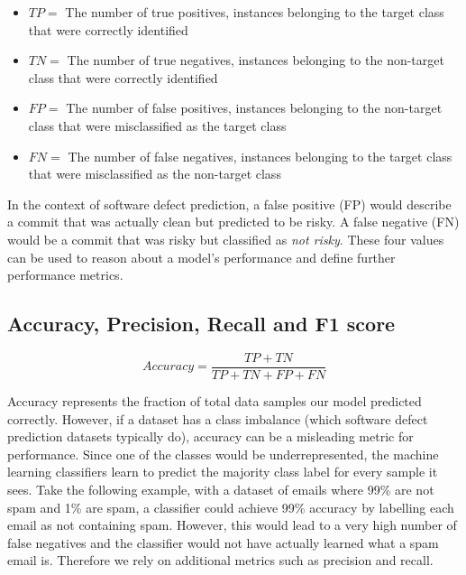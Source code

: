 \documentclass[../main.tex]{subfiles}
\begin{document}
\begin{itemize}
    \item $TP=$ The number of true positives, instances belonging to the target class that were correctly identified
    
    \item $TN=$ The number of true negatives, instances belonging to the non-target class that were correctly identified
    
    \item $FP=$ The number of false positives, instances belonging to the non-target class that were misclassified as the target class
    
    \item $FN=$ The number of false negatives, instances belonging to the target class that were misclassified as the non-target class
\end{itemize}

In the context of software defect prediction, a false positive (FP) would describe a commit that was actually clean but predicted to be risky. A false negative (FN) would be a commit that was risky but classified as \textit{not risky}. These four values can be used to reason about a model's performance and define further performance metrics. 

\subsection{Accuracy, Precision, Recall and F1 score}

\vspace{20pt}

\begin{equation}
    Accuracy = \frac{TP+TN}{TP+TN+FP+FN}
\end{equation}

\vspace{10pt}

Accuracy represents the fraction of total data samples our model predicted correctly. However, if a dataset has a class imbalance (which software defect prediction datasets typically do), accuracy can be a misleading metric for performance. Since one of the classes would be underrepresented, the machine learning classifiers learn to predict the majority class label for every sample it sees. Take the following example, with a dataset of emails where 99\% are not spam and 1\% are spam, a classifier could achieve 99\% accuracy by labelling each email as not containing spam. However, this would lead to a very high number of false negatives and the classifier would not have actually learned what a spam email is. Therefore we rely on additional metrics such as precision and recall.
\end{document}
